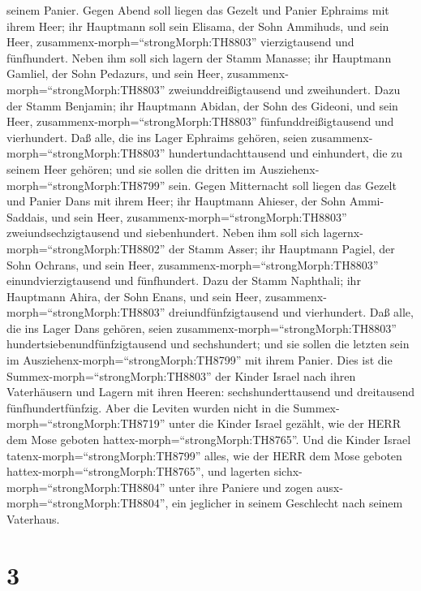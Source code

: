seinem Panier.  Gegen Abend soll liegen das Gezelt und
Panier Ephraims mit ihrem Heer; ihr Hauptmann soll sein Elisama, der
Sohn Ammihuds,  und sein Heer,
zusammenx-morph=``strongMorph:TH8803'' vierzigtausend und fünfhundert.
 Neben ihm soll sich lagern der Stamm Manasse; ihr
Hauptmann Gamliel, der Sohn Pedazurs,  und sein Heer,
zusammenx-morph=``strongMorph:TH8803'' zweiunddreißigtausend und
zweihundert.  Dazu der Stamm Benjamin; ihr Hauptmann
Abidan, der Sohn des Gideoni,  und sein Heer,
zusammenx-morph=``strongMorph:TH8803'' fünfunddreißigtausend und
vierhundert.  Daß alle, die ins Lager Ephraims gehören,
seien zusammenx-morph=``strongMorph:TH8803'' hundertundachttausend und
einhundert, die zu seinem Heer gehören; und sie sollen die dritten im
Ausziehenx-morph=``strongMorph:TH8799'' sein.  Gegen
Mitternacht soll liegen das Gezelt und Panier Dans mit ihrem Heer; ihr
Hauptmann Ahieser, der Sohn Ammi-Saddais,  und sein Heer,
zusammenx-morph=``strongMorph:TH8803'' zweiundsechzigtausend und
siebenhundert.  Neben ihm soll sich
lagernx-morph=``strongMorph:TH8802'' der Stamm Asser; ihr Hauptmann
Pagiel, der Sohn Ochrans,  und sein Heer,
zusammenx-morph=``strongMorph:TH8803'' einundvierzigtausend und
fünfhundert.  Dazu der Stamm Naphthali; ihr Hauptmann
Ahira, der Sohn Enans,  und sein Heer,
zusammenx-morph=``strongMorph:TH8803'' dreiundfünfzigtausend und
vierhundert.  Daß alle, die ins Lager Dans gehören, seien
zusammenx-morph=``strongMorph:TH8803'' hundertsiebenundfünfzigtausend
und sechshundert; und sie sollen die letzten sein im
Ausziehenx-morph=``strongMorph:TH8799'' mit ihrem Panier. 
Dies ist die Summex-morph=``strongMorph:TH8803'' der Kinder Israel nach
ihren Vaterhäusern und Lagern mit ihren Heeren: sechshunderttausend und
dreitausend fünfhundertfünfzig.  Aber die Leviten wurden
nicht in die Summex-morph=``strongMorph:TH8719'' unter die Kinder Israel
gezählt, wie der HERR dem Mose geboten
hattex-morph=``strongMorph:TH8765''.  Und die Kinder Israel
tatenx-morph=``strongMorph:TH8799'' alles, wie der HERR dem Mose geboten
hattex-morph=``strongMorph:TH8765'', und lagerten
sichx-morph=``strongMorph:TH8804'' unter ihre Paniere und zogen
ausx-morph=``strongMorph:TH8804'', ein jeglicher in seinem Geschlecht
nach seinem Vaterhaus.

\hypertarget{section-2}{%
\section{3}\label{section-2}}

